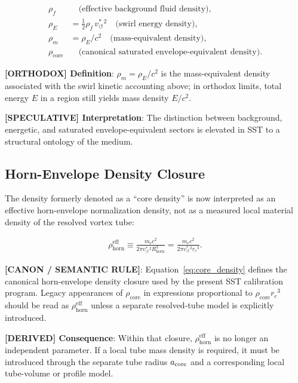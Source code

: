\documentclass[11pt]{article}
\theoremstyle{definition}
\theoremstyle{plain}
\theoremstyle{remark}
\newcommand{\rhoF}{{\rho_{\!f}}}
\newcommand{\rhoE}{\rho_{\!E}}
\newcommand{\rhoM}{\rho_{\!m}}
\newcommand{\rhocore}{\rho_{\mathrm{core}}}
\newcommand{\rhohorn}{\rho_{\mathrm{horn}}^{\mathrm{eff}}}
\newcommand{\rc}{{r_c}}
\newcommand{\vchar}{v_{\!\boldsymbol{\circlearrowleft}}^{\ast}}
\begin{document}
        \begin{align}
            \rhoF &\quad \text{(effective background fluid density)}, \\
            \rhoE &= \tfrac12 \rhoF \, \vchar^2 \quad \text{(swirl energy density)}, \\
            \rhoM &= \rhoE / c^2 \quad \text{(mass-equivalent density)}, \\
            \rhocore &\quad \text{(canonical saturated envelope-equivalent density)}.
        \end{align}

        \textbf{[ORTHODOX] Definition}: $\rhoM=\rhoE/c^2$ is the mass-equivalent density associated with the swirl kinetic accounting above; in orthodox limits, total energy $E$ in a region still yields mass density $E/c^2$.

        \textbf{[SPECULATIVE] Interpretation}: The distinction between background, energetic, and saturated envelope-equivalent sectors is elevated in SST to a structural ontology of the medium.
    
    \subsection{Horn-Envelope Density Closure}
        
        The density formerly denoted as a ``core density'' is now interpreted as an
        effective horn-envelope normalization density, not as a measured local
        material density of the resolved vortex tube:
        
        \begin{align}
            \rhohorn
            \equiv
            \frac{m_e c^2}{2\pi \vchar^2 R_{\mathrm{horn}}^3}
            =
            \frac{m_e c^2}{2\pi \vchar^2 \rc^3}.
            \label{eq:core_density}
        \end{align}
        
        \textbf{[CANON / SEMANTIC RULE]}: Equation~\eqref{eq:core_density}
        defines the canonical horn-envelope density closure used by the present
        SST calibration program. Legacy appearances of $\rhocore$ in expressions
        proportional to $\rhocore\rc^3$ should be read as $\rhohorn$ unless a
        separate resolved-tube model is explicitly introduced.

        \textbf{[DERIVED] Consequence}: Within that closure, $\rhohorn$ is no
        longer an independent parameter. If a local tube mass density is required,
        it must be introduced through the separate tube radius $a_{\rm core}$ and
        a corresponding local tube-volume or profile model.
\end{document}
